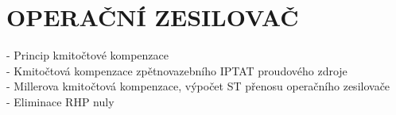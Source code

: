 \section{OPERAČNÍ ZESILOVAČ}
- Princip kmitočtové kompenzace\\
- Kmitočtová kompenzace zpětnovazebního IPTAT proudového zdroje\\
- Millerova kmitočtová kompenzace, výpočet ST přenosu operačního zesilovače\\
- Eliminace RHP nuly\\
